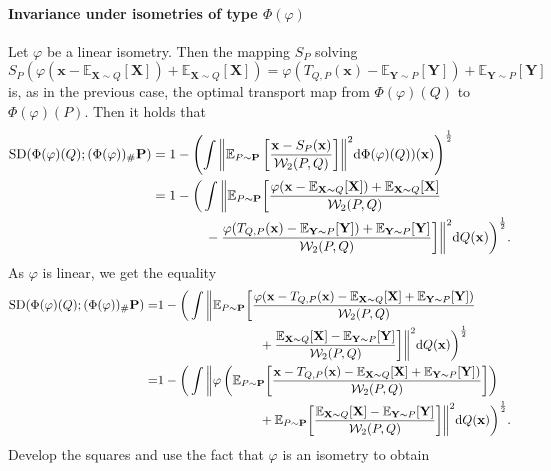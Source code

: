 \documentclass{imsart}
\numberwithin{equation}{section}
\def\E{\mathbb{E}}
\def\x{\mathbf{x}}
\def\X{\mathbf{X}}
\def\Y{\mathbf{Y}}
\def\E{\mathbb E}
\def\x{\mathbf x}
\begin{document}
\paragraph*{Invariance under  isometries of type $\Phi(\varphi)$} Let $\varphi$ be a linear isometry. Then the mapping $S_P$ solving  
$$ S_P(\varphi(\x-\E_{\X\sim Q}[\X])+\E_{\X\sim Q}[\X])=  \varphi(T_{Q,P}(\x)-\E_{\Y\sim P}[\Y])+\E_{\Y\sim P}[\Y] $$
is, as in the previous case, the optimal transport map from $\Phi(\varphi)(Q)$ to $\Phi(\varphi)(P)$. Then it holds that 
\begin{align*}
	\mathrm{SD}(\Phi(\varphi)(Q); (\Phi(\varphi))_\# {\bf P})&=1-  \left(\int{ \left\|\E_{P\sim  {\bf P} }\left[  \frac{\x-S_P(\x)}{\mathcal{W}_2(P,Q)}\right]\right\|^2} \mathrm{d}\Phi(\varphi) (Q))(\x)\right)^{\frac{1}{2}}\\
	&=1-  \bigg(\int   \bigg\|\E_{P\sim {\bf P}}  \bigg[  \frac{\varphi(\x-\E_{\X\sim Q}[\X])+\E_{\X\sim Q}[\X]}{\mathcal{W}_2(P,Q)}  \\
	&\qquad \qquad -\frac{\varphi(T_{Q,P}(\x)-\E_{\Y\sim P}[\Y])+\E_{\Y\sim P}[\Y]}{\mathcal{W}_2(P,Q)}\bigg]  \bigg\|^2 \mathrm{d} Q(\x)  \bigg)^{\frac{1}{2}}.  
\end{align*}
As $\varphi$ is linear, we get the equality 
\begin{align*}
	\mathrm{SD}(\Phi(\varphi)(Q); (\Phi(\varphi))_\# {\bf P})=
	&1-  \bigg(\int   \bigg\|\E_{P\sim {\bf P}}  \bigg[  \frac{\varphi(\x-T_{Q,P}(\x)-\E_{\X\sim Q}[\X]+\E_{\Y\sim P}[\Y])}{\mathcal{W}_2(P,Q)}\\
	&\qquad \qquad\qquad \qquad +\frac{\E_{\X\sim Q}[\X]-\E_{\Y\sim P}[\Y]}{\mathcal{W}_2(P,Q)}\bigg]  \bigg\|^2 \mathrm{d} Q(\x)  \bigg)^{\frac{1}{2}}\\
	=&1-  \bigg(\int   \bigg\|\varphi \left(\E_{P\sim {\bf P}}  \bigg[  \frac{\x-T_{Q,P}(\x)-\E_{\X\sim Q}[\X]+\E_{\Y\sim P}[\Y])}{\mathcal{W}_2(P,Q)}\bigg]\right)
	\\
	&\qquad \qquad\qquad \qquad +\E_{P\sim {\bf P}}  \bigg[\frac{\E_{\X\sim Q}[\X]-\E_{\Y\sim P}[\Y]}{\mathcal{W}_2(P,Q)}\bigg]  \bigg\|^2 \mathrm{d} Q(\x)  \bigg)^{\frac{1}{2}}.
\end{align*}
Develop the squares and use the fact that $\varphi$ is an isometry to obtain 
\end{document}
